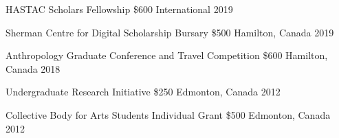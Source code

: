 



\begin{cvhonors}


    \cvhonor
        {HASTAC Scholars Fellowship} %
        {\$600} %
        {International} %
        {2019} %

    \cvhonor
        {Sherman Centre for Digital Scholarship Bursary} %
        {\$500} %
        {Hamilton, Canada} %
        {2019} %

    \cvhonor
        {Anthropology Graduate Conference and Travel Competition} %
        {\$600} %
        {Hamilton, Canada} %
        {2018} %

    \cvhonor
        {Undergraduate Research Initiative} %
        {\$250} %
        {Edmonton, Canada} %
        {2012} %

    \cvhonor
        {Collective Body for Arts Students Individual Grant} %
        {\$500} %
        {Edmonton, Canada} %
        {2012} %

\end{cvhonors}



